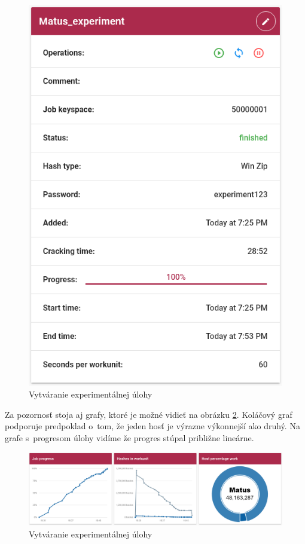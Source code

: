 \documentclass[slovak]{fitthesis}
\begin{document}
\begin{figure}[H]
    \centering
    \includegraphics[scale=0.6]{obrazky/exp2.PNG}
    \caption{Vytváranie experimentálnej úlohy}
    \label{fig:exp2}
\end{figure}
Za pozornosť stoja aj grafy, ktoré je možné vidieť na obrázku \ref{fig:exp3}. Koláčový graf podporuje predpoklad o~tom, že jeden hosť je výrazne výkonnejší ako druhý. Na grafe s~progresom úlohy vidíme že progres stúpal približne lineárne. 
\begin{figure}[H]
    \centering
    \includegraphics[scale=0.4]{obrazky/exp3.PNG}
    \caption{Vytváranie experimentálnej úlohy}
    \label{fig:exp3}
\end{figure}
\end{document}
